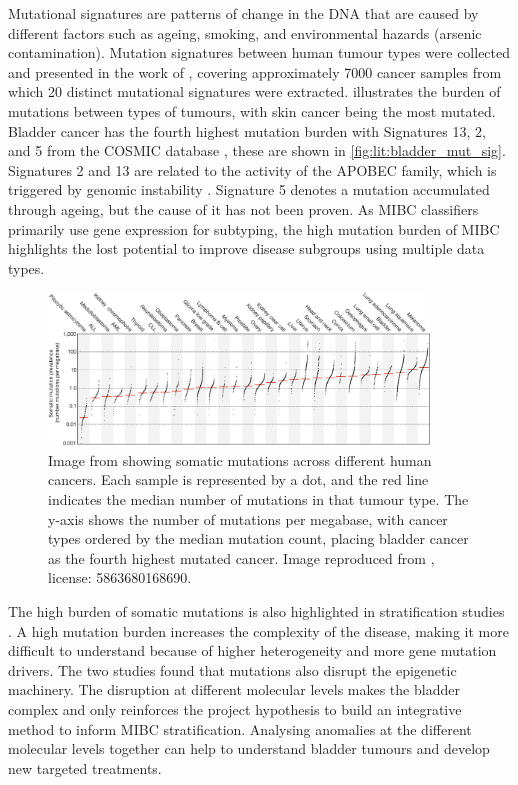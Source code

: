 Mutational signatures are patterns of change in the DNA that are caused by different factors such as ageing, smoking, and environmental hazards (arsenic contamination). Mutation signatures between human tumour types were collected and presented in the work of \citeauthor{Alexandrov2013-gi}, covering approximately 7000 cancer samples from which 20 distinct mutational signatures were extracted.  illustrates the burden of mutations between types of tumours, with skin cancer being the most mutated. Bladder cancer has the fourth highest mutation burden with Signatures 13, 2, and 5 from the COSMIC database \citep{Tate2019-yj}, these are shown in \cref{fig:lit:bladder_mut_sig}. Signatures 2 and 13 are related to the activity of the APOBEC family, which is triggered by genomic instability \citep{Baker2022-xw}. Signature 5 denotes a mutation accumulated through ageing, but the cause of it has not been proven. As MIBC classifiers primarily use gene expression for subtyping, the high mutation burden of MIBC highlights the lost potential to improve disease subgroups using multiple data types.

\begin{figure}[!t]    
    \centering
\includegraphics[width=0.9\textwidth,height=0.9\textheight,keepaspectratio]{Sections/Lit_review/Resources/mut_sig_cancers.jpg}
    \caption[Somatic mutations across human cancers]{Image from \cite{Alexandrov2013-gi} showing somatic mutations across different human cancers. Each sample is represented by a dot, and the red line indicates the median number of mutations in that tumour type. The y-axis shows the number of mutations per megabase, with cancer types ordered by the median mutation count, placing bladder cancer as the fourth highest mutated cancer. Image reproduced from \citep{Alexandrov2013-gi}, license: 5863680168690. }
    \label{fig:lit:cancer_mut_sig}
\end{figure}

The high burden of somatic mutations is also highlighted in stratification studies \citep{Tcga2014-dr, Robertson2017-mg, Kamoun2020-tj}. A high mutation burden increases the complexity of the disease, making it more difficult to understand because of higher heterogeneity and more gene mutation drivers. The two studies \citep{Tcga2014-dr, Robertson2017-mg} found that mutations also disrupt the epigenetic machinery. The disruption at different molecular levels makes the bladder complex and only reinforces the project hypothesis to build an integrative method to inform MIBC stratification. Analysing anomalies at the different molecular levels together can help to understand bladder tumours and develop new targeted treatments.


